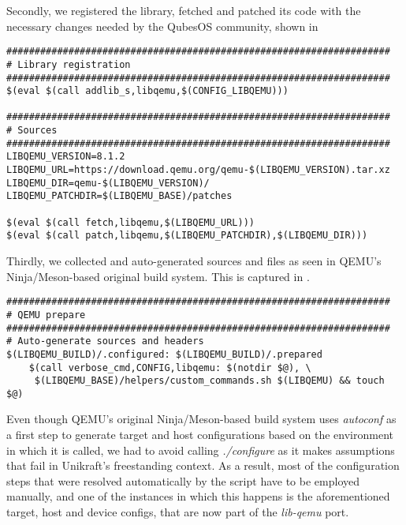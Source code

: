 Secondly, we registered the library, fetched and patched its code with the necessary changes needed by the QubesOS community, shown in 

\begin{lstlisting}
####################################################################
# Library registration
####################################################################
$(eval $(call addlib_s,libqemu,$(CONFIG_LIBQEMU)))
    
####################################################################
# Sources
####################################################################
LIBQEMU_VERSION=8.1.2
LIBQEMU_URL=https://download.qemu.org/qemu-$(LIBQEMU_VERSION).tar.xz
LIBQEMU_DIR=qemu-$(LIBQEMU_VERSION)/
LIBQEMU_PATCHDIR=$(LIBQEMU_BASE)/patches
    
$(eval $(call fetch,libqemu,$(LIBQEMU_URL)))
$(eval $(call patch,libqemu,$(LIBQEMU_PATCHDIR),$(LIBQEMU_DIR)))
\end{lstlisting}

Thirdly, we collected and auto-generated sources and files as seen in QEMU's Ninja/Meson-based original build system.
This is captured in .

\begin{lstlisting}
####################################################################
# QEMU prepare
####################################################################
# Auto-generate sources and headers
$(LIBQEMU_BUILD)/.configured: $(LIBQEMU_BUILD)/.prepared
    $(call verbose_cmd,CONFIG,libqemu: $(notdir $@), \
     $(LIBQEMU_BASE)/helpers/custom_commands.sh $(LIBQEMU) && touch $@)
\end{lstlisting}

Even though QEMU's original Ninja/Meson-based build system uses \textit{autoconf} \cite{autoconf} as a first step to generate target and host configurations based on the environment in which it is called, we had to avoid calling \textit{./configure} as it makes assumptions that fail in Unikraft's freestanding context.
As a result, most of the configuration steps that were resolved automatically by the script have to be employed manually, and one of the instances in which this happens is the aforementioned target, host and device configs, that are now part of the \textit{lib-qemu} port.

